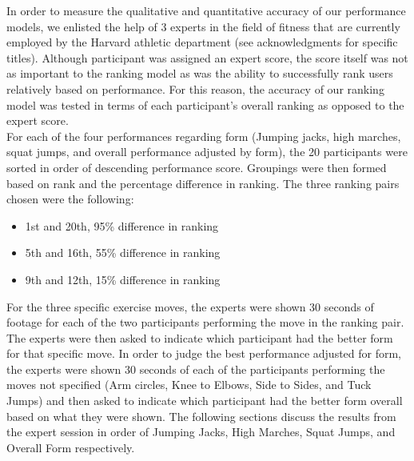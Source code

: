 In order to measure the qualitative and quantitative accuracy of our performance models, we enlisted the help of 3 experts in the field of fitness that are currently employed by the Harvard athletic department (see acknowledgments for specific titles).   Although participant was assigned an expert score, the score itself was not as important to the ranking model as was the ability to successfully rank users relatively based on performance.  For this reason, the accuracy of our ranking model was tested in terms of each participant's overall ranking as opposed to the expert score.\\
 For each of the four performances regarding form (Jumping jacks, high marches, squat jumps, and overall performance adjusted by form), the 20 participants were sorted in order of descending performance score.  Groupings were then formed based on rank and the percentage difference in ranking.  The three ranking pairs chosen were the following: \\
\begin{itemize}
	\item{1st and 20th, 95\% difference in ranking} \\
	\item{5th and 16th, 55\% difference in ranking} \\
	\item{9th and 12th, 15\% difference in ranking} 
\end{itemize}
For the three specific exercise moves, the experts were shown 30 seconds of footage for each of the two participants performing the move in the ranking pair.  The experts were then asked to indicate which participant had the better form for that specific move.  In order to judge the best performance adjusted for form, the experts were shown 30 seconds of each of the participants performing the moves not specified (Arm circles, Knee to Elbows, Side to Sides, and Tuck Jumps) and then asked to indicate which participant had the better form overall based on what they were shown.  The following sections discuss the results from the expert session in order of Jumping Jacks, High Marches, Squat Jumps, and Overall Form respectively.\\

